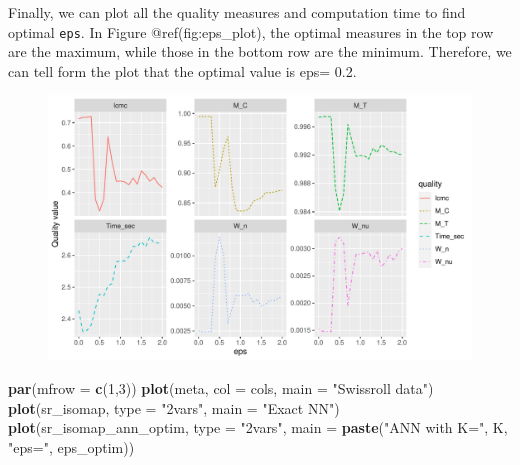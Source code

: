 \documentclass[11pt,a4paper,]{article}
\newenvironment{Shaded}{\begin{snugshade}}{\end{snugshade}}
\newcommand{\CommentTok}[1]{\textcolor[rgb]{0.56,0.35,0.01}{\textit{#1}}}
\newcommand{\DataTypeTok}[1]{\textcolor[rgb]{0.13,0.29,0.53}{#1}}
\newcommand{\DecValTok}[1]{\textcolor[rgb]{0.00,0.00,0.81}{#1}}
\newcommand{\KeywordTok}[1]{\textcolor[rgb]{0.13,0.29,0.53}{\textbf{#1}}}
\newcommand{\NormalTok}[1]{#1}
\newcommand{\OperatorTok}[1]{\textcolor[rgb]{0.81,0.36,0.00}{\textbf{#1}}}
\newcommand{\OtherTok}[1]{\textcolor[rgb]{0.56,0.35,0.01}{#1}}
\newcommand{\StringTok}[1]{\textcolor[rgb]{0.31,0.60,0.02}{#1}}
\begin{document}
Finally, we can plot all the quality measures and computation time to find optimal \texttt{eps}. In Figure @ref(fig:eps\_plot), the optimal measures in the top row are the maximum, while those in the bottom row are the minimum. Therefore, we can tell form the plot that the optimal value is eps= 0.2.

\begin{figure}

{\centering \includegraphics[width=1\linewidth]{Simulation_files/figure-latex/eps_plot-1} 

}

\end{figure}

\begin{Shaded}
\end{Shaded}

\begin{Shaded}
\begin{Highlighting}[]
\KeywordTok{par}\NormalTok{(}\DataTypeTok{mfrow =} \KeywordTok{c}\NormalTok{(}\DecValTok{1}\NormalTok{,}\DecValTok{3}\NormalTok{))}
\KeywordTok{plot}\NormalTok{(meta, }\DataTypeTok{col =}\NormalTok{ cols, }\DataTypeTok{main =} \StringTok{"Swissroll data"}\NormalTok{)}
\KeywordTok{plot}\NormalTok{(sr\_isomap, }\DataTypeTok{type =} \StringTok{"2vars"}\NormalTok{, }\DataTypeTok{main =} \StringTok{"Exact NN"}\NormalTok{)}
\KeywordTok{plot}\NormalTok{(sr\_isomap\_ann\_optim, }\DataTypeTok{type =} \StringTok{"2vars"}\NormalTok{, }
     \DataTypeTok{main =} \KeywordTok{paste}\NormalTok{(}\StringTok{"ANN with K="}\NormalTok{, K, }\StringTok{"eps="}\NormalTok{, eps\_optim))}
\end{Highlighting}
\end{Shaded}
\end{document}

